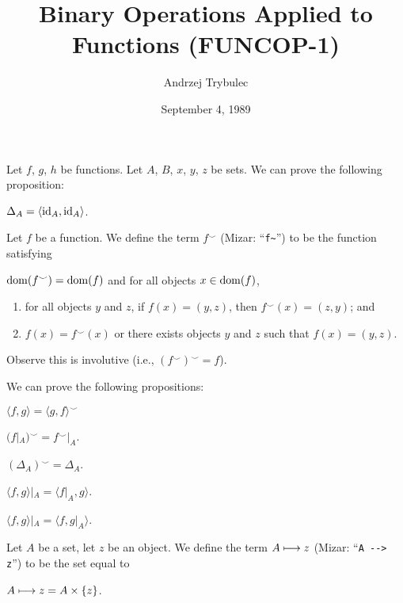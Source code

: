 \documentclass{article}
\title{Binary Operations Applied to Functions (FUNCOP-1)}
\author{Andrzej Trybulec}
\date{September 4, 1989}
\begin{document}
\maketitle

Let $f$, $g$, $h$ be functions. Let $A$, $B$, $x$, $y$, $z$ be sets.
We can prove the following proposition:
\begin{thm}
\item\label{funcop1:1} $\Delta_{A}=\langle\operatorname{id}_{A},\operatorname{id}_{A}\rangle$.
\end{thm}

\begin{definition}
Let $f$ be a function.
We define the term $f^{\smile}$ (Mizar: ``\verb#f~#'') to be the function satisfying
\begin{defn}
\item $\operatorname{dom}(f^{\smile})=\operatorname{dom}(f)$ and for all objects $x\in\operatorname{dom}(f)$,
  \begin{enumerate}[label=(\roman*)]
  \item for all objects $y$ and $z$, if $f(x)=(y,z)$, then $f^{\smile}(x)=(z,y)$;
    and
  \item $f(x)=f^{\smile}(x)$ or there exists objects $y$ and $z$ such
    that $f(x)=(y,z)$.
  \end{enumerate}
\end{defn}
Observe this is involutive (i.e., $(f^{\smile})^{\smile}=f$).
\end{definition}

We can prove the following propositions:
\begin{thm}
\item\label{funcop1:2} $\langle f,g\rangle=\langle g,f\rangle^{\smile}$
\item\label{funcop1:3} $(f|_{A})^{\smile}=f^{\smile}|_{A}$.
\item\label{funcop1:4} $(\Delta_{A})^{\smile}=\Delta_{A}$.
\item\label{funcop1:5} $\langle f,g\rangle|_{A}=\langle f|_{A},g\rangle$.
\item\label{funcop1:6} $\langle f,g\rangle|_{A}=\langle f,g|_{A}\rangle$.
\end{thm}

\begin{definition}
Let $A$ be a set, let $z$ be an object.
We define the term $A\longmapsto z$ (Mizar: ``\verb#A --> z#'')
to be the set equal to
\begin{defn}
\item $A\longmapsto z= A\times\{z\}$.
\end{defn}
\end{definition}
\end{document}
